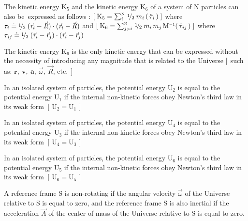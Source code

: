 \documentclass[10pt]{article}
\newcommand{\med}{\raise.5ex\hbox{$\scriptstyle 1$}\kern-.15em/\kern-.09em\lower.25ex\hbox{$\scriptstyle 2$}}
\begin{document}
\par \bigskip\smallskip \noindent The kinetic energy ${\mathrm{K}}_5$ and the kinetic energy ${\mathrm{K}}_6$ of a system of N particles can also \hbox {be expressed} as follows : $[ \; {\mathrm{K}}_5 = \sum_i^{\scriptscriptstyle{\mathrm{N}}} \, \med \; m_i \, ( \, {\ddot{\tau}}_{\hspace{+0.045em}i} \, ) \; ]$ where ${\tau}_{i} \doteq \med \; ({\vec{\mathit{r}}}_{i} - {\vec{\mathit{R}}}) \cdot ({\vec{\mathit{r}}}_{i} - {\vec{\mathit{R}}})$ and \hbox {$[ \; {\mathrm{K}}_6 = \sum_{j{\scriptscriptstyle >}i}^{\scriptscriptstyle{\mathrm{N}}} \, \med \; m_i \, m_j \, {\mathrm{M}}^{\scriptscriptstyle -1} ( \, {\ddot{\tau}}_{\hspace{+0.060em}ij} \, ) \; ]$} where ${\tau}_{\hspace{+0.060em}ij} \doteq \med \; ({\vec{\mathit{r}}}_{i} - {\vec{\mathit{r}}}_{j}) \cdot ({\vec{\mathit{r}}}_{i} - {\vec{\mathit{r}}}_{j})$

\par \bigskip\smallskip \noindent The kinetic energy ${\mathrm{K}}_6$ is the only kinetic energy that can be expressed without the necessity of introducing any magnitude that is related to the Universe $[ \:\: $such as\hspace{+0.060em}: ${\mathbf{r}},\: {\mathbf{v}},\: {\mathbf{a}},\: {\vec{\omega}},\: {\vec{\mathit{R}}}$, etc.$ \:\: ]$

\par \bigskip\smallskip \noindent In an isolated system of particles, the potential energy ${\mathrm{U}}_2$ is equal to the potential energy ${\mathrm{U}}_1$ if the internal non-kinetic forces obey Newton's third law in its weak form $[ \, {\mathrm{U}}_2 = {\mathrm{U}}_1 \, ]$

\par \bigskip\smallskip \noindent In an isolated system of particles, the potential energy ${\mathrm{U}}_4$ is equal to the potential energy ${\mathrm{U}}_3$ if the internal non-kinetic forces obey Newton's third law in its weak form $[ \, {\mathrm{U}}_4 = {\mathrm{U}}_3 \, ]$

\par \bigskip\smallskip \noindent In an isolated system of particles, the potential energy ${\mathrm{U}}_6$ is equal to the potential energy ${\mathrm{U}}_5$ if the internal non-kinetic forces obey Newton's third law in its weak form $[ \, {\mathrm{U}}_6 = {\mathrm{U}}_5 \, ]$

\par \bigskip\smallskip \noindent A reference frame S is non-rotating if the angular velocity ${\vec{\omega}}$ of the Universe relative to S is equal to zero, and the reference frame S is also inertial if the acceleration ${\vec{\mathit{A}}}$ of the center of mass of the Universe relative to S is equal to zero.
\end{document}

